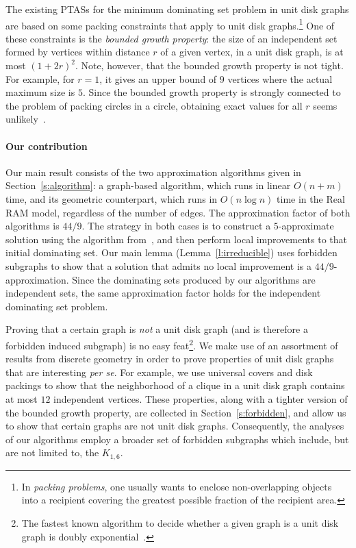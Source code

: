 \documentclass[preprint,12pt]{elsarticle}
\begin{document}
The existing PTASs for the minimum dominating set problem in unit disk graphs are based on some packing constraints
that apply to unit disk graphs.\footnote{In \emph{packing problems}, one usually wants to enclose non-{over\-lapping} objects into a recipient  
covering the greatest possible fraction of the recipient area.} 
One of these constraints is the \emph{bounded growth property}: the size of an independent set formed by vertices within distance $r$ of a given vertex, in a unit disk graph, is at most $(1+2r)^2$. Note, however, that the bounded growth property is not tight. For example, for $r=1$, it gives an upper bound of $9$ vertices where the actual maximum size is $5$. Since the bounded growth property is strongly connected to the problem of packing circles in a circle, obtaining exact values for all $r$ seems unlikely~\cite{Fodor}.


\paragraph*{Our contribution}
Our main result consists of the two approximation algorithms given in Section~\ref{s:algorithm}: a graph-based algorithm, which runs in linear $O(n+m)$ time, and its geometric counterpart, which runs in $O(n\log n)$ time in the Real RAM model, regardless of the number of edges.
The approximation factor of both algorithms is $44/9$. The strategy in both cases is to construct a $5$-approximate solution using the algorithm from~\cite{heuristics}, and then perform local improvements to that initial dominating set. Our main lemma (Lemma~\ref{l:irreducible}) uses forbidden subgraphs to show that a solution that admits no local improvement is a $44/9$-approximation. Since the dominating sets produced by our algorithms are independent sets, the same approximation factor holds for the independent dominating set problem.

Proving that a certain graph is \emph{not} a unit disk graph (and is therefore a forbidden induced subgraph) is no easy feat\footnote{The fastest known algorithm to decide whether a given graph is a unit disk graph is doubly exponential~\cite{spinrad}.}. We make use of an assortment of results from discrete geometry in order to prove properties of unit disk graphs that are interesting \textit{per se}.
For example, we use universal covers and disk packings to show that the neighborhood of a clique in a unit disk graph contains at most $12$ independent vertices.
These properties, along with a tighter version of the bounded growth property, are collected in Section~\ref{s:forbidden}, and
allow us to show that certain graphs are not unit disk graphs. Consequently, the analyses of our algorithms employ a broader set of forbidden subgraphs which include, but are not limited to, the $K_{1,6}$.
\end{document}
